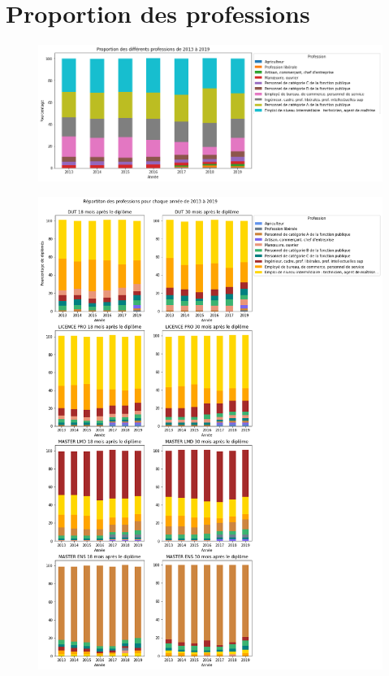 \documentclass[12pt, a4paper, titlepage, table]{article}
\begin{document}
\section{Proportion des professions}
\begin{figure}[H]
	\centering
	\includegraphics[width=1\textwidth]{../graphs/repartition_professions_global.png}
\end{figure}

\begin{figure}[H]
	\centering
	\includegraphics[width=1\textwidth]{../graphs/repartition_professions_situation.png}
\end{figure}
\end{document}
